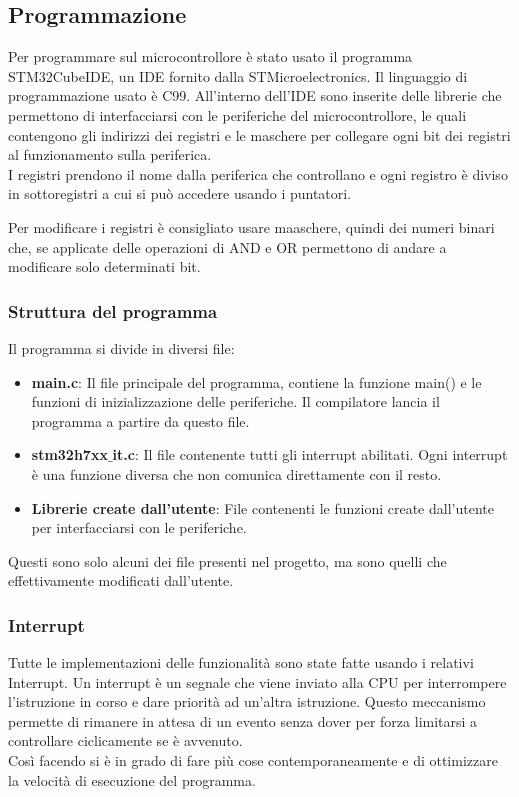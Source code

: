 

\subsection{Programmazione}
Per programmare sul microcontrollore è stato usato il programma STM32CubeIDE, un IDE fornito dalla STMicroelectronics. Il linguaggio di programmazione usato è C99. All'interno dell'IDE sono inserite delle librerie che permettono di interfacciarsi con le periferiche del microcontrollore, le quali contengono gli indirizzi dei registri e le maschere per collegare ogni bit dei registri al funzionamento sulla periferica.\\

I registri prendono il nome dalla periferica che controllano e ogni registro è diviso in sottoregistri a cui si può accedere usando i puntatori.

Per modificare i registri è consigliato usare maaschere, quindi dei numeri binari che, se applicate delle operazioni di AND e OR permettono di andare a modificare solo determinati bit.

\subsubsection{Struttura del programma}
Il programma si divide in diversi file:
\begin{itemize}
    \item \textbf{main.c}: Il file principale del programma, contiene la funzione main() e le funzioni di inizializzazione delle periferiche. Il compilatore lancia il programma a partire da questo file.
    \item \textbf{stm32h7xx$\_$it.c}: Il file contenente tutti gli interrupt abilitati. Ogni interrupt è una funzione diversa che non comunica direttamente con il resto.
    \item \textbf{Librerie create dall'utente}: File contenenti le funzioni create dall'utente per interfacciarsi con le periferiche.
\end{itemize}

Questi sono solo alcuni dei file presenti nel progetto, ma sono quelli che effettivamente modificati dall'utente.

\subsubsection{ Interrupt }
Tutte le implementazioni delle funzionalità sono state fatte usando i relativi Interrupt. Un interrupt è un segnale che viene inviato alla CPU per interrompere l'istruzione in corso e dare priorità ad un'altra istruzione. Questo meccanismo permette di rimanere in attesa di un evento senza dover per forza limitarsi a controllare ciclicamente se è avvenuto.\\
Così facendo si è in grado di fare più cose contemporaneamente e di ottimizzare la velocità di esecuzione del programma.\\

